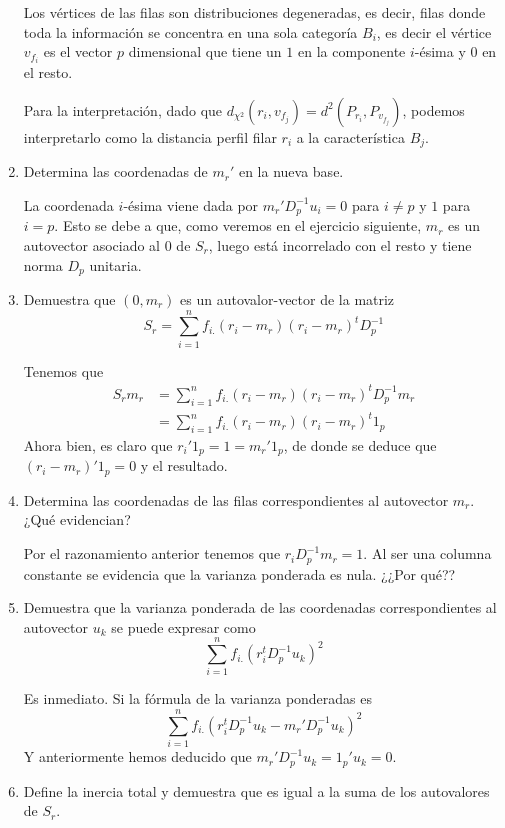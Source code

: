 \documentclass[twoside]{article}
\begin{document}
\begin{enumerate}
Los vértices de las filas son distribuciones degeneradas, es decir, filas donde toda la información se concentra en una sola categoría $B_i$, es decir el vértice $v_{f_i}$ es el vector $p$ dimensional que tiene un $1$ en la componente $i$-ésima y $0$ en el resto.

Para la interpretación, dado que $d_{\chi^2}(r_i,v_{f_j})= d^2(P_{r_i},P_{v_{f_j}})$, podemos interpretarlo como la distancia perfil filar $r_i$ a la característica $B_j$.

\item Determina las coordenadas de $m_r'$ en la nueva base. 

La coordenada $i$-ésima viene dada por $m_r' D_p^{-1} u_i=0$ para $i\neq p$ y $1$ para $i=p$. Esto se debe a que, como veremos en el ejercicio siguiente, $m_r$ es un autovector asociado al $0$ de $S_r$, luego está incorrelado con el resto y tiene norma $D_p$ unitaria.
\item Demuestra que $(0, m_r)$ es un autovalor-vector de la matriz
\[ S_r = \sum_{i=1}^n f_{i.} (r_i - m_r) (r_i - m_r)^t D_p^{-1} \]

Tenemos que
\begin{align*}
S_rm_r &= \sum_{i=1}^n f_{i.} (r_i - m_r) (r_i - m_r)^t D_p^{-1} m_r\\
& = \sum_{i=1}^n f_{i.} (r_i - m_r) (r_i - m_r)^t 1_p
\end{align*}
Ahora bien, es claro que $r_i' 1_p = 1 = m_r' 1_p$, de donde se deduce que $(r_i-m_r)'1_p = 0$ y el resultado.

\item Determina las coordenadas de las filas correspondientes al autovector $m_r$. ¿Qué evidencian?

Por el razonamiento anterior tenemos que $r_i D_p^{-1} m_r = 1$. Al ser una columna constante se evidencia que la varianza ponderada es nula. ¿¿Por qué??

\item Demuestra que la varianza ponderada de las coordenadas correspondientes al autovector $u_k$ se puede expresar como
\[ \sum_{i=1}^n f_{i.} (r_i^t D_p^{-1} u_k)^2 \]

Es inmediato. Si la fórmula de la varianza ponderadas es
$$
\sum_{i=1}^n f_{i.} (r_i^t D_p^{-1} u_k-m_r'D_p^{-1}u_k)^2
$$
Y anteriormente hemos deducido que $m_r'D_p^{-1}u_k =1_p'u_k = 0$. 
\item Define la inercia total y demuestra que es igual a la suma de los autovalores de $S_r$.


\end{enumerate}
\end{document}

